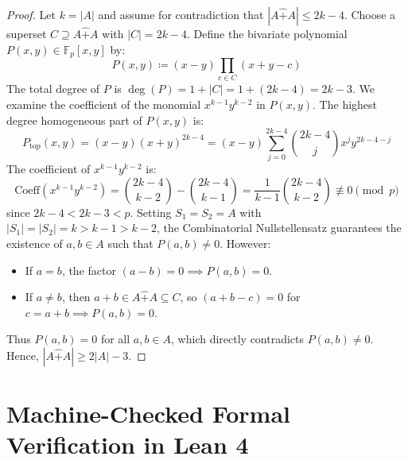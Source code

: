 \documentclass[11pt,a4paper]{article}
\theoremstyle{definition}
\begin{document}
\begin{proof}
Let $k = |A|$ and assume for contradiction that $|A \hat{+} A| \le 2k - 4$.
Choose a superset $C \supseteq A \hat{+} A$ with $|C| = 2k - 4$.
Define the bivariate polynomial $P(x, y) \in \mathbb{F}_p[x, y]$ by:
\[ P(x, y) \coloneqq (x - y) \prod_{c \in C} (x + y - c) \]
The total degree of $P$ is $\deg(P) = 1 + |C| = 1 + (2k - 4) = 2k - 3$.
We examine the coefficient of the monomial $x^{k-1} y^{k-2}$ in $P(x, y)$.
The highest degree homogeneous part of $P(x, y)$ is:
\[ P_{\mathrm{top}}(x, y) = (x - y) (x + y)^{2k - 4} = (x - y) \sum_{j=0}^{2k - 4} \binom{2k - 4}{j} x^j y^{2k - 4 - j} \]
The coefficient of $x^{k-1} y^{k-2}$ is:
\[ \text{Coeff}(x^{k-1} y^{k-2}) = \binom{2k - 4}{k - 2} - \binom{2k - 4}{k - 1} = \frac{1}{k - 1} \binom{2k - 4}{k - 2} \not\equiv 0 \pmod p \]
since $2k - 4 < 2k - 3 < p$.
Setting $S_1 = S_2 = A$ with $|S_1| = |S_2| = k > k - 1 > k - 2$, the Combinatorial Nullstellensatz guarantees the existence of $a, b \in A$ such that $P(a, b) \ne 0$.
However:
\begin{itemize}
    \item If $a = b$, the factor $(a - b) = 0 \implies P(a, b) = 0$.
    \item If $a \ne b$, then $a + b \in A \hat{+} A \subseteq C$, so $(a + b - c) = 0$ for $c = a + b \implies P(a, b) = 0$.
\end{itemize}
Thus $P(a, b) = 0$ for all $a, b \in A$, which directly contradicts $P(a, b) \ne 0$.
Hence, $|A \hat{+} A| \ge 2|A| - 3$.
\end{proof}

\section{Machine-Checked Formal Verification in Lean 4}
\end{document}

